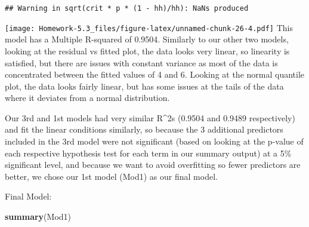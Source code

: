 \documentclass[
]{article}
\newenvironment{Shaded}{\begin{snugshade}}{\end{snugshade}}
\newcommand{\KeywordTok}[1]{\textcolor[rgb]{0.13,0.29,0.53}{\textbf{#1}}}
\newcommand{\NormalTok}[1]{#1}
\begin{document}
\begin{verbatim}
## Warning in sqrt(crit * p * (1 - hh)/hh): NaNs produced
\end{verbatim}

\texttt{[image: Homework-5.3\_files/figure-latex/unnamed-chunk-26-4.pdf]}
This model has a Multiple R-squared of 0.9504. Similarly to our other
two models, looking at the residual vs fitted plot, the data looks very
linear, so linearity is satisfied, but there are issues with constant
variance as most of the data is concentrated between the fitted values
of 4 and 6. Looking at the normal quantile plot, the data looks fairly
linear, but has some issues at the tails of the data where it deviates
from a normal distribution.

Our 3rd and 1st models had very similar R\^{}2s (0.9504 and 0.9489
respectively) and fit the linear conditions similarly, so because the 3
additional predictors included in the 3rd model were not significant
(based on looking at the p-value of each respective hypothesis test for
each term in our summary output) at a 5\% significant level, and because
we want to avoid overfitting so fewer predictors are better, we chose
our 1st model (Mod1) as our final model.

Final Model:

\begin{Shaded}
\begin{Highlighting}[]
\KeywordTok{summary}\NormalTok{(Mod1)}
\end{Highlighting}
\end{Shaded}
\end{document}
